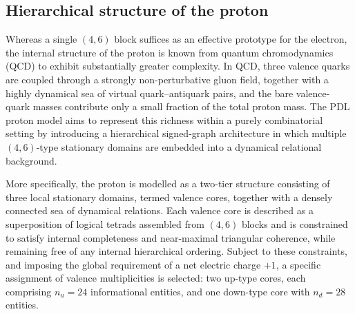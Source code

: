 \documentclass[11pt,a4paper]{article}
\begin{document}
\subsection{Hierarchical structure of the proton}
Whereas a single $(4,6)$ block suffices as an effective prototype for the electron, the internal structure of the proton is known from quantum chromodynamics (QCD) to exhibit substantially greater complexity. In QCD, three valence quarks are coupled through a strongly non-perturbative gluon field, together with a highly dynamical sea of virtual quark–antiquark pairs, and the bare valence-quark masses contribute only a small fraction of the total proton mass.\cite{AmslerQCDProton} The PDL proton model aims to represent this richness within a purely combinatorial setting by introducing a hierarchical signed-graph architecture in which multiple $(4,6)$-type stationary domains are embedded into a dynamical relational background.\cite{LaubscherIntroPDL2026,LaubscherPDLFull2026,LaubscherLDP2026}

More specifically, the proton is modelled as a two-tier structure consisting of three local stationary domains, termed valence cores, together with a densely connected sea of dynamical relations.\cite{LaubscherPDLFull2026,LaubscherLDP2026} Each valence core is described as a superposition of logical tetrads assembled from $(4,6)$ blocks and is constrained to satisfy internal completeness and near-maximal triangular coherence, while remaining free of any internal hierarchical ordering. Subject to these constraints, and imposing the global requirement of a net electric charge $+1$, a specific assignment of valence multiplicities is selected: two up-type cores, each comprising $n_u=24$ informational entities, and one down-type core with $n_d=28$ entities.\cite{LaubscherPDLFull2026,LaubscherLDP2026}
\end{document}
